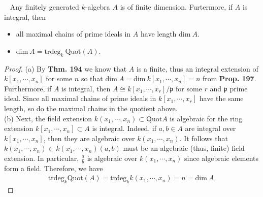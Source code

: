 \documentclass[12pt,a4paper,footinclude=true,headinclude=true]{scrbook} %
\newenvironment{corollary}[2][]
{\renewcommand\theinnercustomcol{#2}\innercustomcol[#1]
\begin{mdframed}[backgroundcolor=gray!20]\ }
{\end{mdframed}\endinnercustomcol}
\begin{document}
\begin{corollary}{198}
    Any finitely generated $k$-algebra $A$ is of finite dimension. Furtermore, if $A$ is integral, then
    \begin{itemize}
        \item[(a)] all maximal chains of prime ideals in $A$ have length $\mathrm{dim}\ A$.
        \item[(b)] $\mathrm{dim}\ A=\mathrm{trdeg}_k\ \mathrm{Quot}(A)$.
    \end{itemize}
\end{corollary}
\begin{proof}
    (a) By \textbf{Thm. 194} we know that $A$ is a finite, thus an integral extension of $k[x_1,\cdots,x_n]$ for some $n$ so that $\mathrm{dim}\ A=\mathrm{dim}\ k[x_1,\cdots,x_n]=n$ from \textbf{Prop. 197}. Furthermore, if $A$ is integral, then $A\cong k[x_1,\cdots,x_r]/\mathfrak{p}$ for some $r$ and $\mathfrak{p}$ prime ideal. Since all maximal chains of prime ideals in $k[x_1,\cdots,x_r]$ have the same length, so do the maximal chains in the quotient above.\\
    (b) Next, the field extension $k(x_1,\cdots,x_n)\subset\mathrm{Quot}A$ is algebraic for the ring extension $k[x_1,\cdots,x_n]\subset A$ is integral. Indeed, if $a,b\in A$ are integral over $k[x_1,\cdots,x_n]$, then they are algebraic over $k(x_1,\cdots,x_n)$. It follows that $k(x_1,\cdots,x_n)\subset k(x_1,\cdots,x_n)(a,b)$ must be an algebraic (thus, finite) field extension. In particular, $\frac{a}{b}$ is algebraic over $k(x_1,\cdots,x_n)$ since algebraic elements form a field. Therefore, we have
    \begin{align*}
        \mathrm{trdeg}_k\mathrm{Quot}(A)=\mathrm{trdeg}_kk(x_1,\cdots,x_n)=n=\mathrm{dim}\ A.
    \end{align*}
\end{proof}

\newpage
\end{document}

